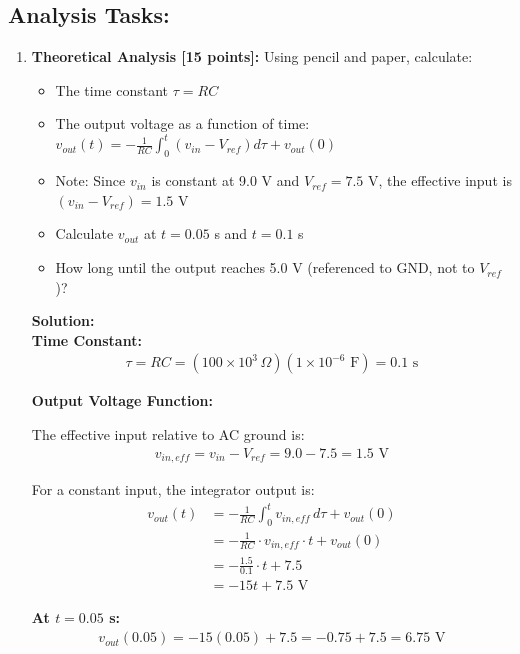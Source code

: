 \documentclass[11pt]{article}
\newenvironment{solution}
    {\color{blue}\textbf{Solution:}\\}
    {}
\begin{document}
\subsection*{Analysis Tasks:}

\begin{enumerate}[label=\textbf{2.\arabic*}]
    \item \textbf{Theoretical Analysis [15 points]:} Using pencil and paper, calculate:
    \begin{itemize}
        \item The time constant $\tau = RC$
        \item The output voltage as a function of time: $v_{out}(t) = -\frac{1}{RC} \int_0^t (v_{in} - V_{ref}) d\tau + v_{out}(0)$
        \item Note: Since $v_{in}$ is constant at 9.0 V and $V_{ref} = 7.5$ V, the effective input is $(v_{in} - V_{ref}) = 1.5$ V
        \item Calculate $v_{out}$ at $t = 0.05$ s and $t = 0.1$ s
        \item How long until the output reaches 5.0 V (referenced to GND, not to $V_{ref}$)?
    \end{itemize}
    
\begin{solution}
\textbf{Time Constant:}
\begin{align*}
\tau = RC = (100 \times 10^3\,\Omega)(1 \times 10^{-6}\text{ F}) = 0.1\text{ s}
\end{align*}

\textbf{Output Voltage Function:}

The effective input relative to AC ground is:
\begin{align*}
v_{in, eff} = v_{in} - V_{ref} = 9.0 - 7.5 = 1.5\text{ V}
\end{align*}

For a constant input, the integrator output is:
\begin{align*}
v_{out}(t) &= -\frac{1}{RC} \int_0^t v_{in, eff} \, d\tau + v_{out}(0)\\
&= -\frac{1}{RC} \cdot v_{in, eff} \cdot t + v_{out}(0)\\
&= -\frac{1.5}{0.1} \cdot t + 7.5\\
&= -15t + 7.5\text{ V}
\end{align*}

\textbf{At $t = 0.05$ s:}
\begin{align*}
v_{out}(0.05) = -15(0.05) + 7.5 = -0.75 + 7.5 = 6.75\text{ V}
\end{align*}


\end{solution}
\end{enumerate}
\end{document}
